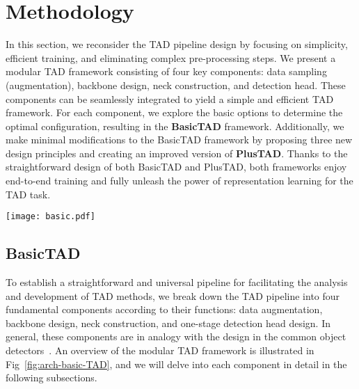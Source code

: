 \documentclass[a4paper,fleqn]{cas-dc}
\begin{document}
\section{Methodology}
\label{sec:methodology}
In this section, we reconsider the TAD pipeline design by focusing on simplicity, efficient training, and eliminating complex pre-processing steps.
We present a modular TAD framework consisting of four key components: data sampling (augmentation), backbone design, neck construction, and detection head. These components can be seamlessly integrated to yield a simple and efficient TAD framework. 
For each component, we explore the basic options to determine the optimal configuration, resulting in the {\bf BasicTAD} framework. Additionally, we make minimal modifications to the BasicTAD framework by proposing three new design principles and creating an improved version of {\bf PlusTAD}. Thanks to the straightforward design of both BasicTAD and PlusTAD, both frameworks enjoy end-to-end training and fully unleash the power of representation learning for the TAD task.

\begin{figure*}[!t]
  \texttt{[image: basic.pdf]}
  \caption{
\textbf{BasicTAD Pipeline.}
Our BasicTAD exhibits a modular design framework for the TAD task, composed of data sampling (augmentation), backbone, neck, and detection head.
(a) The backbone is a spatial-temporal network to extract temporal features.
(b) The neck module of BasicTAD offers three different ways of construction to leverage the extracted features. In the neck module, $n$ means the number of stages in the backbone, and stage $n$ is the last stage of the backbone. Stage $n*$ contains extra pooling operations on stage $n$ to construct a temporal feature with low temporal resolution. Particularly, $\bigoplus$ represents adding two features. As the temporal dimension of features varies across different scales, we interpolate the high-level features along the temporal dimension to align them with the low-level features before addition. (c) We adopt a typical one-stage network as the detection head, implemented by anchor-based and anchor-free methods. 
}
  \label{fig:arch-basic-TAD}
\end{figure*}

\subsection{BasicTAD}
 \label{basictad}
\label{sec:basictad}
To establish a straightforward and universal pipeline for facilitating the analysis and development of TAD methods, we break down the TAD pipeline into four fundamental components according to their functions: data augmentation, backbone design, neck construction, and one-stage detection head design. In general, these components are in analogy with the design in the common object detectors~\citep{fcos, retina}. An overview of the modular TAD framework is illustrated in Fig~\ref{fig:arch-basic-TAD}, and we will delve into each component in detail in the following subsections.
\end{document}
